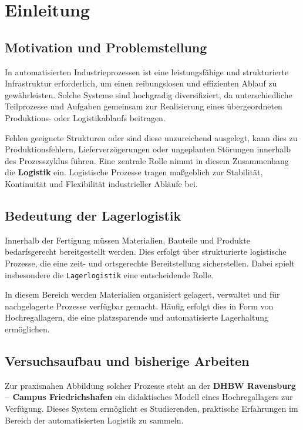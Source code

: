 \section{Einleitung}

\subsection{Motivation und Problemstellung}

In automatisierten Industrieprozessen ist eine leistungsfähige und strukturierte Infrastruktur erforderlich, um einen reibungslosen und effizienten Ablauf zu gewährleisten. Solche Systeme sind hochgradig diversifiziert, da unterschiedliche Teilprozesse und Aufgaben gemeinsam zur Realisierung eines übergeordneten Produktions- oder Logistikablaufs beitragen.

Fehlen geeignete Strukturen oder sind diese unzureichend ausgelegt, kann dies zu Produktionsfehlern, Lieferverzögerungen oder ungeplanten Störungen innerhalb des Prozesszyklus führen. Eine zentrale Rolle nimmt in diesem Zusammenhang die \textbf{Logistik} ein. Logistische Prozesse tragen maßgeblich zur Stabilität, Kontinuität und Flexibilität industrieller Abläufe bei.

\subsection{Bedeutung der Lagerlogistik}

Innerhalb der Fertigung müssen Materialien, Bauteile und Produkte bedarfsgerecht bereitgestellt werden. Dies erfolgt über strukturierte logistische Prozesse, die eine zeit- und ortsgerechte Bereitstellung sicherstellen. Dabei spielt insbesondere die \texttt{Lagerlogistik} eine entscheidende Rolle.

In diesem Bereich werden Materialien organisiert gelagert, verwaltet und für nachgelagerte Prozesse verfügbar gemacht. Häufig erfolgt dies in Form von Hochregallagern, die eine platzsparende und automatisierte Lagerhaltung ermöglichen.

\subsection{Versuchsaufbau und bisherige Arbeiten}

Zur praxisnahen Abbildung solcher Prozesse steht an der \textbf{DHBW Ravensburg – Campus Friedrichshafen} ein didaktisches Modell eines Hochregallagers zur Verfügung. Dieses System ermöglicht es Studierenden, praktische Erfahrungen im Bereich der automatisierten Logistik zu sammeln.

